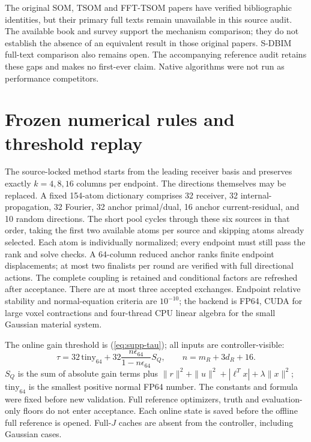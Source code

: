 \documentclass[11pt]{article}
\begin{document}
The original SOM, TSOM and FFT-TSOM papers have verified bibliographic identities, but their primary full texts remain unavailable in this source audit. The available book and survey support the mechanism comparison; they do not establish the absence of an equivalent result in those original papers. S-DBIM full-text comparison also remains open. The accompanying reference audit retains these gaps and makes no first-ever claim. Native algorithms were not run as performance competitors.

\section{Frozen numerical rules and threshold replay}
The source-locked method starts from the leading receiver basis and preserves exactly $k=4,8,16$ columns per endpoint. The directions themselves may be replaced. A fixed 154-atom dictionary comprises 32 receiver, 32 internal-propagation, 32 Fourier, 32 anchor primal/dual, 16 anchor current-residual, and 10 random directions. The short pool cycles through these six sources in that order, taking the first two available atoms per source and skipping atoms already selected. Each atom is individually normalized; every endpoint must still pass the rank and solve checks. A 64-column reduced anchor ranks finite endpoint displacements; at most two finalists per round are verified with full directional actions. The complete coupling is retained and conditional factors are refreshed after acceptance. There are at most three accepted exchanges. Endpoint relative stability and normal-equation criteria are $10^{-10}$; the backend is FP64, CUDA for large voxel contractions and four-thread CPU linear algebra for the small Gaussian material system.

The online gain threshold is (\ref{eq:supp-tau}); all inputs are controller-visible:
\begin{equation}\label{eq:supp-tau}
\tau=32\,\mathrm{tiny}_{64}+32\frac{n\epsilon_{64}}{1-n\epsilon_{64}}S_Q,
\qquad n=m_R+3d_R+16.
\end{equation}
$S_Q$ is the sum of absolute gain terms plus $\|r\|^2+\|u\|^2+|\ell^Tx|+\lambda\|x\|^2$; $\mathrm{tiny}_{64}$ is the smallest positive normal FP64 number. The constants and formula were fixed before new validation. Full reference optimizers, truth and evaluation-only floors do not enter acceptance. Each online state is saved before the offline full reference is opened. Full-$J$ caches are absent from the controller, including Gaussian cases.
\end{document}
